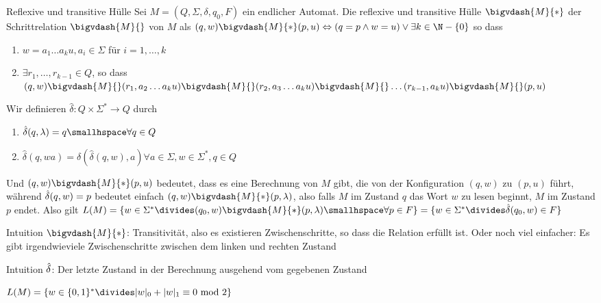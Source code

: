 \begin{definition}[]{Reflexive und transitive Hülle}
    Sei $M = (Q, \Sigma, \delta, q_0, F)$ ein endlicher Automat. Die reflexive und transitive Hülle $\bigvdash{M}{*}$ der Schrittrelation $\bigvdash{M}{}$ von $M$ als
    $(q, w) \bigvdash{M}{*} (p, u) \Leftrightarrow (q = p \land w = u) \lor \exists k \in \N - \{ 0 \}$ so dass
    \begin{enumerate}[label=\textit{(\roman*)}]
        \item $w = a_1\ldots a_ku, a_i \in \Sigma$ für $i = 1, \ldots, k$
        \item $\exists r_1, \ldots, r_{k - 1} \in Q$, so dass
              $(q, w) \bigvdash{M}{} (r_1, a_2 \ldots a_k u) \bigvdash{M}{} (r_2, a_3 \ldots a_k u) \bigvdash{M}{} \ldots (r_{k - 1}, a_k u) \bigvdash{M}{} (p, u)$
    \end{enumerate}
    Wir definieren $\hat{\delta}: Q \times \Sigma^* \rightarrow Q$ durch
    \rmvspace
    \rmvspace
    \begin{multicols}{2}
        \begin{enumerate}[label=\textit{(\roman*)}]
            \item $\hat{\delta}(q, \lambda) = q \smallhspace \forall q \in Q$
            \item $\hat{\delta}(q, wa) = \delta(\hat{\delta}(q, w), a) \forall a \in \Sigma, w \in \Sigma^*, q \in Q$
        \end{enumerate}
    \end{multicols}
\end{definition}
Und $(q, w) \bigvdash{M}{*} (p, u)$ bedeutet, dass es eine Berechnung von $M$ gibt, die von der Konfiguration $(q, w)$ zu $(p, u)$ führt,
während $\hat{\delta}(q, w) = p$ bedeutet einfach $(q, w) \bigvdash{M}{*} (p, \lambda)$, also falls $M$ im Zustand $q$ das Wort $w$ zu lesen beginnt, $M$ im Zustand $p$ endet.
Also gilt $L(M) = \{ w \in \Sigma^* \divides (q_0, w) \bigvdash{M}{*} (p, \lambda) \smallhspace \forall p \in F \} = \{ w \in \Sigma^* \divides \hdelta(q_0, w) \in F \}$

Intuition $\bigvdash{M}{*}$: Transitivität, also es existieren Zwischenschritte, so dass die Relation erfüllt ist.
Oder noch viel einfacher: Es gibt irgendwieviele Zwischenschritte zwischen dem linken und rechten Zustand

Intuition $\hat{\delta}$: Der letzte Zustand in der Berechnung ausgehend vom gegebenen Zustand

\inlinelemma $L(M) = \{ w \in \{ 0, 1 \}^* \divides |w|_0 + |w|_1 \equiv 0 \text{ mod } 2 \}$

